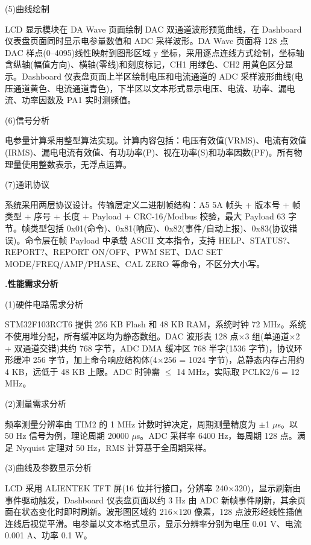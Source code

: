 \documentclass[UTF8,a4paper,zihao=-4,fontset=macnew]{ctexart}
\makeatletter
\def\@extractsubnum#1.#2\@nil{#2}
\newcommand{\subsectiontitle}[2]{%
  \setcounter{subsection}{\numexpr\@extractsubnum#1\@nil-1\relax}\refstepcounter{subsection}%
  \vspace{0.34cm}%
  {\noindent\heiti\bfseries\fontsize{16pt}{18pt}\selectfont #1.\quad #2\par}%
  \vspace{0.54cm}%
}
\newcommand{\itemline}[2]{%
  {\setlength{\leftskip}{2em}\setlength{\parindent}{0pt}%
  \noindent(#1)\quad #2\par}%
}
\makeatother
\begin{document}
\itemline{5}{曲线绘制}

LCD 显示模块在 DA Wave 页面绘制 DAC 双通道波形预览曲线，在 Dashboard 仪表盘页面同时显示电参量数值和 ADC 采样波形。DA Wave 页面将 128 点 DAC 样点(0--4095)线性映射到图形区域 y 坐标，采用逐点连线方式绘制，坐标轴含纵轴(幅值方向)、横轴(零线)和刻度标记，CH1 用绿色、CH2 用黄色区分显示。Dashboard 仪表盘页面上半区绘制电压和电流通道的 ADC 采样波形曲线(电压通道黄色、电流通道青色)，下半区以文本形式显示电压、电流、功率、漏电流、功率因数及 PA1 实时测频值。

\itemline{6}{信号分析}

电参量计算采用整型算法实现。计算内容包括：电压有效值(VRMS)、电流有效值(IRMS)、漏电电流有效值、有功功率(P)、视在功率(S)和功率因数(PF)。所有物理量使用整数表示，无浮点运算。

\itemline{7}{通讯协议}

系统采用两层协议设计。传输层定义二进制帧结构：A5 5A 帧头 + 版本号 + 帧类型 + 序号 + 长度 + Payload + CRC-16/Modbus 校验，最大 Payload 63 字节。帧类型包括 0x01(命令)、0x81(响应)、0x82(事件/自动上报)、0x83(协议错误)。命令层在帧 Payload 中承载 ASCII 文本指令，支持 HELP、STATUS?、REPORT?、REPORT ON/OFF、PWM SET、DAC SET MODE/FREQ/AMP/PHASE、CAL ZERO 等命令，不区分大小写。

\subsectiontitle{2.2}{性能需求分析}
\label{sec:analysis-performance}

\itemline{1}{硬件电路需求分析}

STM32F103RCT6 提供 256 KB Flash 和 48 KB RAM，系统时钟 72 MHz。系统不使用堆分配，所有缓冲区均为静态数组。DAC 波形表 128 点$\times$3 组(单通道$\times$2 + 双通道交错)共约 768 字节，ADC DMA 缓冲区 768 半字(1536 字节)，协议环形缓冲 256 字节，加上命令响应结构体(4$\times$256 = 1024 字节)，总静态内存占用约 4 KB，远低于 48 KB 上限。ADC 时钟需 $\leq$ 14 MHz，实际取 PCLK2/6 = 12 MHz。

\itemline{2}{测量需求分析}

频率测量分辨率由 TIM2 的 1 MHz 计数时钟决定，周期测量精度为 $\pm$1 $\mu$s。以 50 Hz 信号为例，理论周期 20000 $\mu$s。ADC 采样率 6400 Hz，每周期 128 点。满足 Nyquist 定理对 50 Hz，RMS 计算基于全周期采样。

\itemline{3}{曲线及参数显示分析}

LCD 采用 ALIENTEK TFT 屏(16 位并行接口，分辨率 240$\times$320)，显示刷新由事件驱动触发，Dashboard 仪表盘页面以约 3 Hz 由 ADC 新帧事件刷新，其余页面在状态变化时即时刷新。波形图区域约 216$\times$120 像素，128 点波形经线性插值连线后视觉平滑。电参量以文本格式显示，显示分辨率分别为电压 0.01 V、电流 0.001 A、功率 0.1 W。
\end{document}
